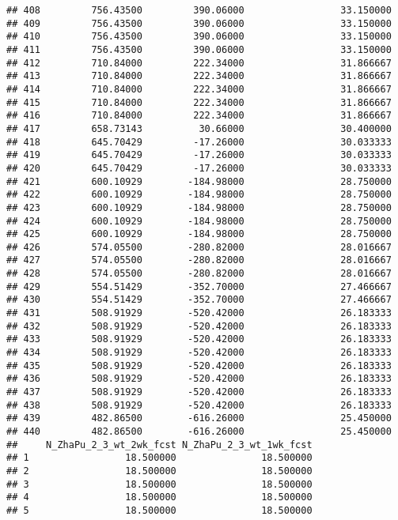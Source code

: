 \documentclass[]{article}
\begin{document}
\begin{verbatim}
## 408         756.43500         390.06000                 33.150000
## 409         756.43500         390.06000                 33.150000
## 410         756.43500         390.06000                 33.150000
## 411         756.43500         390.06000                 33.150000
## 412         710.84000         222.34000                 31.866667
## 413         710.84000         222.34000                 31.866667
## 414         710.84000         222.34000                 31.866667
## 415         710.84000         222.34000                 31.866667
## 416         710.84000         222.34000                 31.866667
## 417         658.73143          30.66000                 30.400000
## 418         645.70429         -17.26000                 30.033333
## 419         645.70429         -17.26000                 30.033333
## 420         645.70429         -17.26000                 30.033333
## 421         600.10929        -184.98000                 28.750000
## 422         600.10929        -184.98000                 28.750000
## 423         600.10929        -184.98000                 28.750000
## 424         600.10929        -184.98000                 28.750000
## 425         600.10929        -184.98000                 28.750000
## 426         574.05500        -280.82000                 28.016667
## 427         574.05500        -280.82000                 28.016667
## 428         574.05500        -280.82000                 28.016667
## 429         554.51429        -352.70000                 27.466667
## 430         554.51429        -352.70000                 27.466667
## 431         508.91929        -520.42000                 26.183333
## 432         508.91929        -520.42000                 26.183333
## 433         508.91929        -520.42000                 26.183333
## 434         508.91929        -520.42000                 26.183333
## 435         508.91929        -520.42000                 26.183333
## 436         508.91929        -520.42000                 26.183333
## 437         508.91929        -520.42000                 26.183333
## 438         508.91929        -520.42000                 26.183333
## 439         482.86500        -616.26000                 25.450000
## 440         482.86500        -616.26000                 25.450000
##     N_ZhaPu_2_3_wt_2wk_fcst N_ZhaPu_2_3_wt_1wk_fcst
## 1                 18.500000               18.500000
## 2                 18.500000               18.500000
## 3                 18.500000               18.500000
## 4                 18.500000               18.500000
## 5                 18.500000               18.500000

\end{verbatim}
\end{document}
